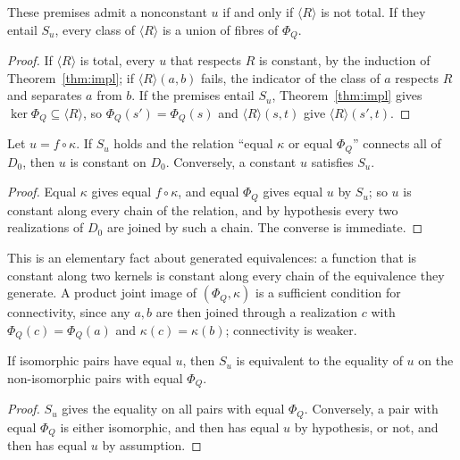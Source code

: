 \begin{theorem}\label{thm:holgura}
These premises admit a nonconstant $u$ if and only if $\langle R\rangle$ is not total. If they entail $S_u$, every class of $\langle R\rangle$ is a union of fibres of $\Phi_Q$.
\end{theorem}
\begin{proof}
If $\langle R\rangle$ is total, every $u$ that respects $R$ is constant, by the induction of Theorem~\ref{thm:impl}; if $\langle R\rangle(a,b)$ fails, the indicator of the class of $a$ respects $R$ and separates $a$ from $b$. If the premises entail $S_u$, Theorem~\ref{thm:impl} gives $\ker\Phi_Q\subseteq\langle R\rangle$, so $\Phi_Q(s')=\Phi_Q(s)$ and $\langle R\rangle(s,t)$ give $\langle R\rangle(s',t)$.
\end{proof}

\begin{theorem}\label{thm:dicotomia}
Let $u=f\circ\kappa$. If $S_u$ holds and the relation ``equal $\kappa$ or equal $\Phi_Q$'' connects all of $D_0$, then $u$ is constant on $D_0$. Conversely, a constant $u$ satisfies $S_u$.
\end{theorem}
\begin{proof}
Equal $\kappa$ gives equal $f\circ\kappa$, and equal $\Phi_Q$ gives equal $u$ by $S_u$; so $u$ is constant along every chain of the relation, and by hypothesis every two realizations of $D_0$ are joined by such a chain. The converse is immediate.
\end{proof}
This is an elementary fact about generated equivalences: a function that is constant along two kernels is constant along every chain of the equivalence they generate. A product joint image of $(\Phi_Q,\kappa)$ is a sufficient condition for connectivity, since any $a,b$ are then joined through a realization $c$ with $\Phi_Q(c)=\Phi_Q(a)$ and $\kappa(c)=\kappa(b)$; connectivity is weaker.

\begin{theorem}\label{thm:residuo}
If isomorphic pairs have equal $u$, then $S_u$ is equivalent to the equality of $u$ on the non-isomorphic pairs with equal $\Phi_Q$.
\end{theorem}
\begin{proof}
$S_u$ gives the equality on all pairs with equal $\Phi_Q$. Conversely, a pair with equal $\Phi_Q$ is either isomorphic, and then has equal $u$ by hypothesis, or not, and then has equal $u$ by assumption.
\end{proof}

